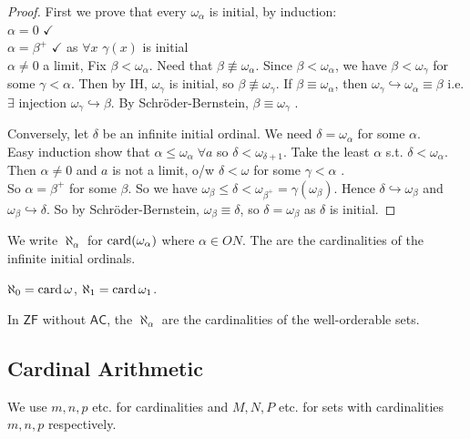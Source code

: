 \begin{proof}
    First we prove that every $\omega_\alpha$ is initial, by induction: \\
    $\alpha = 0$ $\checkmark$ \\
    $\alpha = \beta^+$ $\checkmark$ as $\forall x$ $\gamma(x)$ is initial \\
    $\alpha \neq 0$ a limit, Fix $\beta < \omega_\alpha$.
    Need that $\beta \not\equiv \omega_\alpha$.
    Since $\beta < \omega_\alpha$, we  have $\beta < \omega_\gamma$ for some $\gamma < \alpha$.
    Then by IH, $\omega_\gamma$ is initial, so $\beta \not\equiv \omega_\gamma$.
    If $\beta \equiv \omega_\alpha$, then $\omega_\gamma \hookrightarrow \omega_\alpha \equiv \beta$ i.e. $\exists$ injection $\omega_\gamma \hookrightarrow \beta$.
    By Schr\"oder-Bernstein, $\beta \equiv \omega_\gamma$ \Lightning.

    Conversely, let $\delta$ be an infinite initial ordinal.
    We need $\delta = \omega_\alpha$ for some $\alpha$. \\
    Easy induction show that $\alpha \leq \omega_\alpha \; \forall a$ so $\delta < \omega_{\delta + 1}$.
    Take the least $\alpha$ s.t. $\delta < \omega_\alpha$.
    Then $\alpha \neq 0$ and $a$ is not a limit, o/w $\delta < \omega$ for some $\gamma < \alpha$ \Lightning. \\
    So $\alpha = \beta^+$ for some $\beta$.
    So we have $\omega_\beta \leq \delta < \omega_{\beta^+} = \gamma(\omega_\beta)$.
    Hence $\delta \hookrightarrow \omega_\beta$ and $\omega_\beta \hookrightarrow \delta$.
    So by Schr\"oder-Bernstein, $\omega_\beta \equiv \delta$, so $\delta = \omega_\beta$ as $\delta$ is initial.
\end{proof}

\begin{definition}
    We write $\aleph_\alpha$ for $\operatorname{card}(\omega_\alpha)$ where $\alpha \in ON$.
    The  are the cardinalities of the infinite initial ordinals.
\end{definition}

\begin{example}
    $\aleph_0 = \operatorname{card} \omega$, $\aleph_1 = \operatorname{card} \omega_1$.
\end{example}

In $\mathsf{ZF}$ without $\mathsf{AC}$, the $\aleph_\alpha$ are the cardinalities of the well-orderable sets.

\subsection{Cardinal Arithmetic}
We use $m, n, p$ etc. for cardinalities and $M, N, P$ etc. for sets with cardinalities $m, n, p$ respectively.

